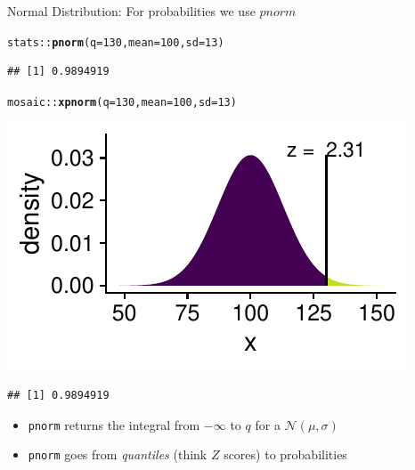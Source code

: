 \documentclass[10pt,handout]{beamer}\usepackage[]{graphicx}\usepackage[]{color}
\makeatletter
\newcommand{\hlnum}[1]{\textcolor[rgb]{0.686,0.059,0.569}{#1}}%
\newcommand{\hlopt}[1]{\textcolor[rgb]{0,0,0}{#1}}%
\newcommand{\hlstd}[1]{\textcolor[rgb]{0.345,0.345,0.345}{#1}}%
\newcommand{\hlkwc}[1]{\textcolor[rgb]{0.333,0.667,0.333}{#1}}%
\newcommand{\hlkwd}[1]{\textcolor[rgb]{0.737,0.353,0.396}{\textbf{#1}}}%
\newenvironment{kframe}{%
 \def\at@end@of@kframe{}%
 \ifinner\ifhmode%
  \def\at@end@of@kframe{\end{minipage}}%
  \begin{minipage}{\columnwidth}%
 \fi\fi%
 \def\FrameCommand##1{\hskip\@totalleftmargin \hskip-\fboxsep
 \colorbox{shadecolor}{##1}\hskip-\fboxsep
     \hskip-\linewidth \hskip-\@totalleftmargin \hskip\columnwidth}%
 \MakeFramed {\advance\hsize-\width
   \@totalleftmargin\z@ \linewidth\hsize
   \@setminipage}}%
 {\par\unskip\endMakeFramed%
 \at@end@of@kframe}
\newenvironment{knitrout}{}{} %
\makeatother
\begin{document}
\begin{frame}[fragile]{Normal Distribution: For probabilities we use $pnorm$}
	
	
\begin{knitrout}\tiny
{}\color{fgcolor}\begin{kframe}
\begin{alltt}
\hlstd{stats}\hlopt{::}\hlkwd{pnorm}\hlstd{(}\hlkwc{q} \hlstd{=} \hlnum{130}\hlstd{,} \hlkwc{mean} \hlstd{=} \hlnum{100}\hlstd{,} \hlkwc{sd} \hlstd{=} \hlnum{13}\hlstd{)}
\end{alltt}
\begin{verbatim}
## [1] 0.9894919
\end{verbatim}
\end{kframe}
\end{knitrout}
	
	
\begin{knitrout}\tiny
{}\color{fgcolor}\begin{kframe}
\begin{alltt}
\hlstd{mosaic}\hlopt{::}\hlkwd{xpnorm}\hlstd{(}\hlkwc{q} \hlstd{=} \hlnum{130}\hlstd{,} \hlkwc{mean} \hlstd{=} \hlnum{100}\hlstd{,} \hlkwc{sd} \hlstd{=} \hlnum{13}\hlstd{)}
\end{alltt}
\end{kframe}

{\centering \includegraphics[width=0.6\linewidth]{figure/probs3-1} 

}


\begin{kframe}\begin{verbatim}
## [1] 0.9894919
\end{verbatim}
\end{kframe}
\end{knitrout}
	
	
	\begin{itemize}
		\item \texttt{pnorm} returns the integral from $-\infty$ to $q$ for a $\mathcal{N}(\mu, \sigma)$
		\item \texttt{pnorm} goes from \textit{quantiles} (think $Z$ scores) to probabilities
	\end{itemize}
	
\end{frame}
\end{document}

